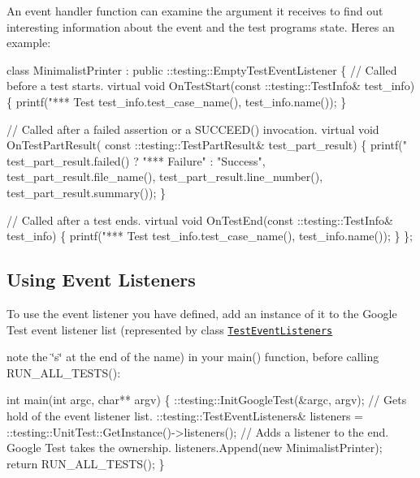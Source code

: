 An event handler function can examine the argument it receives to find out interesting information about the event and the test program\textquotesingle{}s state. Here\textquotesingle{}s an example\+:


\begin{DoxyCode}
class MinimalistPrinter : public ::testing::EmptyTestEventListener \{
  // Called before a test starts.
  virtual void OnTestStart(const ::testing::TestInfo& test\_info) \{
    printf("*** Test %
           test\_info.test\_case\_name(), test\_info.name());
  \}

  // Called after a failed assertion or a SUCCEED() invocation.
  virtual void OnTestPartResult(
      const ::testing::TestPartResult& test\_part\_result) \{
    printf("%
           test\_part\_result.failed() ? "*** Failure" : "Success",
           test\_part\_result.file\_name(),
           test\_part\_result.line\_number(),
           test\_part\_result.summary());
  \}

  // Called after a test ends.
  virtual void OnTestEnd(const ::testing::TestInfo& test\_info) \{
    printf("*** Test %
           test\_info.test\_case\_name(), test\_info.name());
  \}
\};
\end{DoxyCode}


\subsection*{Using Event Listeners}

To use the event listener you have defined, add an instance of it to the Google Test event listener list (represented by class \href{../include/gtest/gtest.h#L929}{\tt Test\+Event\+Listeners}
\begin{DoxyItemize}
\item note the \char`\"{}s\char`\"{} at the end of the name) in your {\ttfamily main()} function, before calling {\ttfamily R\+U\+N\+\_\+\+A\+L\+L\+\_\+\+T\+E\+S\+T\+S()}\+: 
\begin{DoxyCode}
int main(int argc, char** argv) \{
  ::testing::InitGoogleTest(&argc, argv);
  // Gets hold of the event listener list.
  ::testing::TestEventListeners& listeners =
      ::testing::UnitTest::GetInstance()->listeners();
  // Adds a listener to the end.  Google Test takes the ownership.
  listeners.Append(new MinimalistPrinter);
  return RUN\_ALL\_TESTS();
\}
\end{DoxyCode}

\end{DoxyItemize}

